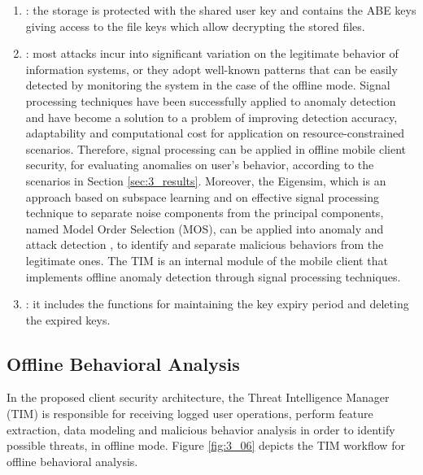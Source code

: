 \begin{enumerate}
	\item {}: the storage is protected with the shared user key and contains the ABE keys giving access to the file keys which allow decrypting the stored files.
	\item {}: most attacks incur into significant variation on the legitimate behavior of information systems, or they adopt well-known patterns that can be easily detected by monitoring the system in the case of the offline mode. Signal processing techniques have been successfully applied to anomaly detection \cite{lu2009network, huang2009signal,vieira2017model} and have become a solution to a problem of improving detection accuracy, adaptability and computational cost for application on resource-constrained scenarios. Therefore, signal processing can be applied in offline mobile client security, for evaluating anomalies on user's behavior, according to the scenarios in Section \ref{sec:3_results}. Moreover, the Eigensim, which is an approach based on subspace learning and on effective signal processing technique to separate noise components from the principal components, named Model Order Selection (MOS), can be applied into anomaly and attack detection \cite{tenorio2013greatest, vieira2017model}, to identify and separate malicious behaviors from the legitimate ones. The TIM is an internal module of the mobile client that implements offline anomaly detection through signal processing techniques.
	\item {}: it includes the functions for maintaining the key expiry period and deleting the expired keys. 
\end{enumerate}


\subsection{Offline Behavioral Analysis}
\label{sec:3_offline_behavioral_analysis}

In the proposed client security architecture, the Threat Intelligence Manager (TIM) is responsible for receiving logged user operations, perform feature extraction, data modeling and malicious behavior analysis in order to identify possible threats, in offline mode. Figure \ref{fig:3_06} depicts the TIM workflow for offline behavioral analysis. 

